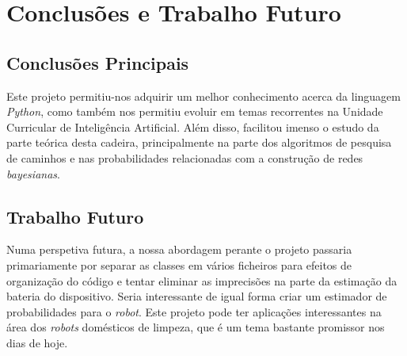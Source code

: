 \chapter{Conclusões e Trabalho Futuro}
\label{chap:conc-trab-futuro}

\section{Conclusões Principais}
\label{sec:conc-princ}

Este projeto permitiu-nos adquirir um melhor conhecimento acerca da linguagem \emph{Python}, como também nos permitiu evoluir em temas recorrentes na Unidade Curricular de Inteligência Artificial. Além disso, facilitou imenso o estudo da parte teórica desta cadeira, principalmente na parte dos algoritmos de pesquisa de caminhos e nas probabilidades relacionadas com a construção de redes \emph{bayesianas}.


\section{Trabalho Futuro}
\label{sec:trab-futuro}

Numa perspetiva futura, a nossa abordagem perante o projeto passaria primariamente por separar as classes em vários ficheiros para efeitos de organização do código e tentar eliminar as imprecisões na parte da estimação da bateria do dispositivo. Seria interessante de igual forma criar um estimador de probabilidades para o \emph{robot}.
Este projeto pode ter aplicações interessantes na área dos \emph{robots} domésticos de limpeza, que é um tema bastante promissor nos dias de hoje.